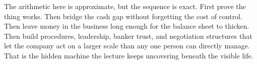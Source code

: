 The arithmetic here is approximate, but the sequence is exact. First prove the thing works. Then bridge the cash gap without forgetting the cost of control. Then leave money in the business long enough for the balance sheet to thicken. Then build procedures, leadership, banker trust, and negotiation structures that let the company act on a larger scale than any one person can directly manage. That is the hidden machine the lecture keeps uncovering beneath the visible life.
